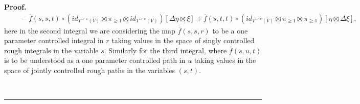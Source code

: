 \documentclass{article}%
\newenvironment{proof}[1][Proof]{\noindent\textbf{#1.} }{\ \rule{0.5em}{0.5em}}
\begin{document}
\begin{proof}
\begin{equation}
\begin{aligned}
    &\quad - \overline f(s,s,t)\circ (id_{T^{<\kappa}(V)}  \boxtimes \pi_{\geq 1} \boxtimes id_{T^{<\kappa}(V)}) \left[\Delta \eta \boxtimes \xi\right] + \overline f(s,t,t) \circ (id_{T^{<\kappa}(V)}  \boxtimes \pi_{\geq 1} \boxtimes \pi_{\geq 1})[\eta \boxtimes \Delta \xi],
\end{aligned}
\end{equation}
here in the second integral we are considering the map $\overline f(s,s,r)$  to be a one parameter controlled integral in $r$ taking values in the space of singly controlled rough integrals in the variable $s$. Similarly for the third integral, where $\overline f(s,u,t)$ is to be understood as a one parameter controlled path in $u$ taking values in the space of jointly controlled rough paths in the variables $(s,t)$.\newline


\end{proof}
\end{document}

